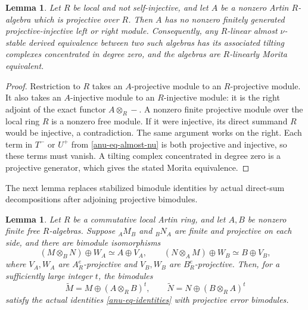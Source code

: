 \documentclass[12pt,a4paper,english,reqno]{amsart}
\numberwithin{equation}{section}
\theoremstyle{plain}
\newtheorem{lemma}[theorem]{Lemma}
\theoremstyle{definition}
\begin{document}
\begin{lemma}\label{anu-lem-nonselfinjective-base}
Let $R$ be local and not self-injective, and let $A$ be a nonzero
Artin $R$-algebra which is projective over $R$.  Then $A$ has no
nonzero finitely generated projective-injective left or right module.
Consequently, any $R$-linear almost $\nu$-stable derived equivalence
between two such algebras has its associated tilting complexes
concentrated in degree zero, and the algebras are $R$-linearly Morita
equivalent.
\end{lemma}

\begin{proof}
Restriction to $R$ takes an $A$-projective module to an $R$-projective
module.  It also takes an $A$-injective module to an $R$-injective
module: it is the right adjoint of the exact functor
$A\otimes_R-$.  A nonzero finite projective module over the local
ring $R$ is a nonzero free module.  If it were injective, its direct
summand $R$ would be injective, a contradiction.  The same argument
works on the right.
Each term in $T^-$ or $U^+$ from \eqref{anu-eq-almost-nu} is both
projective and injective, so these terms must vanish.  A tilting
complex concentrated in degree zero is a projective generator,
which gives the stated Morita equivalence.
\end{proof}

The next lemma replaces stabilized bimodule identities by actual
direct-sum decompositions after adjoining projective bimodules.

\begin{lemma}\label{anu-lem-padding}
Let $R$ be a commutative local Artin ring, and let $A,B$ be nonzero finite
free $R$-algebras.  Suppose ${}_A M_B$ and ${}_B N_A$ are finite and
projective on each side, and there are bimodule isomorphisms
\begin{equation}\label{anu-eq-stabilized}
 (M\otimes_BN)\oplus W_A\simeq A\oplus V_A,
 \qquad
 (N\otimes_AM)\oplus W_B\simeq B\oplus V_B,
\end{equation}
where $V_A,W_A$ are $A_R^e$-projective and $V_B,W_B$ are
$B_R^e$-projective.  Then, for a sufficiently large integer $t$, the bimodules
\[
 \widetilde M=M\oplus(A\otimes_RB)^t,
 \qquad
 \widetilde N=N\oplus(B\otimes_RA)^t
\]
satisfy the actual identities \eqref{anu-eq-identities} with
projective error bimodules.
\end{lemma}
\end{document}

